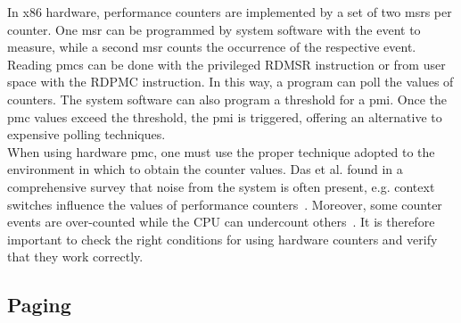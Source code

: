 In x86 hardware, performance counters are implemented by a set of two
\glspl{msr} per counter. One \gls{msr} can be programmed by system software with
the event to measure, while a second \gls{msr} counts the occurrence of the
respective event. Reading \glspl{pmc} can be done with the privileged RDMSR
instruction or from user space with the RDPMC instruction. In this way, a
program can poll the values of counters. The system software can also program a
threshold for a \gls{pmi}. Once the \gls{pmc} values exceed the threshold, the
\gls{pmi} is triggered, offering an alternative to expensive polling
techniques.\\

When using hardware \gls{pmc}, one must use the proper technique adopted to the
environment in which to obtain the counter values. Das et al. found in a
comprehensive survey that noise from the system is often present, e.g. context
switches influence the values of performance counters~\cite{das_sok_2019}.
Moreover, some counter events are over-counted while the CPU can undercount
others~\cite{weaver_non-determinism_2013}. It is therefore important to check
the right conditions for using hardware counters and verify that they work
correctly.

\subsection{Paging}
\label{sec:state:technical:paging}


